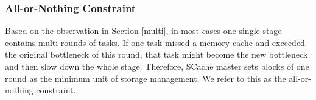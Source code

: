 \subsubsection{All-or-Nothing Constraint}
{\color{blue}
Based on the observation in Section \ref{multi}, in most cases one single stage contains multi-rounds of tasks.
If one task missed a memory cache and exceeded the original bottleneck of this round, that task might become the new bottleneck and then slow down the whole stage. 
Therefore, SCache master sets blocks of one round as the minimum unit of storage management.
We refer to this as the all-or-nothing constraint.
}

